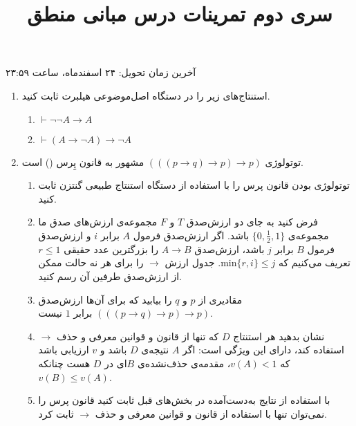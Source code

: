 \documentclass[12pt, 14paper]{article}
\title{سری دوم تمرینات درس مبانی منطق}
\author{}
\date{}
\begin{document}
\maketitle

\vspace{-2.5cm}

\begin{center}آخرین زمان تحویل: ۲۴ اسفندماه، ساعت ۲۳:۵۹\end{center}

\vspace{0.5cm}

\begin{enumerate}

\item
استنتاج‌های زیر را در دستگاه اصل‌موضوعی هیلبرت ثابت کنید.

\begin{enumerate}
\item
$\vdash \neg\neg A\to A$

\item
$\vdash (A\to\neg A)\to \neg A$
\end{enumerate}

\item
توتولوژی
$(((p\to q)\to p)\to p)$
مشهور به قانون پِرس
()
است.
\begin{enumerate}
\item
توتولوژی بودن قانون پرس را با استفاده از دستگاه استنتاج طبیعی گنتزن ثابت کنید.
\item
فرض کنید به جای دو ارزش‌صدق $T$ و $F$ مجموعه‌ی ارزش‌های صدق ما مجموعه‌ی $\{0,\frac{1}{2},1\}$ باشد. اگر ارزش‌صدق فرمول $A$ برابر $i$ و ارزش‌صدق فرمول $B$ برابر $j$ باشد، ارزش‌صدق $A\to B$ را بزرگترین عدد حقیقی $r\leq 1$ تعریف می‌کنیم که
$\text{min}\{r,i\}\leq j$.
جدول ارزش $\to$ را برای هر نه حالت ممکن از ارزش‌صدق طرفین آن رسم کنید.
\item
مقادیری از $p$ و $q$ را بیابید که برای آن‌ها ارزش‌صدق $(((p\to q)\to p)\to p)$ برابر $1$ نیست.
\item
نشان بدهید هر استنتاج $D$ که تنها از قانون
و قوانین معرفی و حذف $\to$ استفاده کند، دارای این ویژگی است: اگر $A$ نتیجه‌ی $D$ باشد و $v$ ارزیابی باشد که $v(A)<1$، مقدمه‌ی حذف‌نشده‌ی $B$ای در $D$ هست چنانکه $v(B)\leq v(A)$.
\item
با استفاده از نتایج به‌دست‌آمده در بخش‌های قبل ثابت کنید قانون پرس را نمی‌توان تنها با استفاده از قانون
و قوانین معرفی و حذف $\to$ ثابت کرد.
\end{enumerate}

\pagebreak


\end{enumerate}
\end{document}
